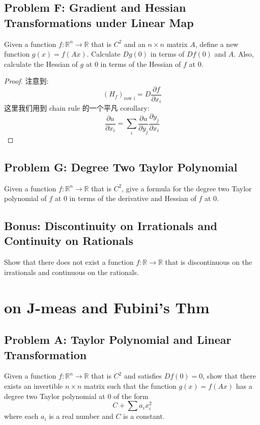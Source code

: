 \documentclass[lang=cn,11pt]{template}
\begin{document}
\section*{Problem F: Gradient and Hessian Transformations under Linear Map}
Given a function \( f : \mathbb{R}^n \rightarrow \mathbb{R} \) that is \( C^2 \) and an \( n \times n \) matrix \( A \), define a new function \( g(x) = f(Ax) \). Calculate \( Dg(0) \) in terms of \( Df(0) \) and \( A \). Also, calculate the Hessian of \( g \) at 0 in terms of the Hessian of \( f \) at 0.
\begin{proof}
    注意到:
    $$
    (H_f)_{\text{row i}} = D \frac{\partial f}{\partial x_i}
    $$
    这里我们用到 chain rule 的一个平凡 corollary:
    $$
    \frac{\partial u}{\partial x_i} = \sum_i \frac{\partial u}{\partial y_j} \frac{\partial y_j}{\partial x_i}
    $$
\end{proof}

\section*{Problem G: Degree Two Taylor Polynomial}
Given a function \( f : \mathbb{R}^n \rightarrow \mathbb{R} \) that is \( C^2 \), give a formula for the degree two Taylor polynomial of \( f \) at 0 in terms of the derivative and Hessian of \( f \) at 0.



\section*{Bonus: Discontinuity on Irrationals and Continuity on Rationals}
Show that there does not exist a function \( f : \mathbb{R} \rightarrow \mathbb{R} \) that is discontinuous on the irrationals and continuous on the rationals.






\chapter{on J-meas and Fubini's Thm}

\section*{Problem A: Taylor Polynomial and Linear Transformation}
Given a function \( f : \mathbb{R}^n \rightarrow \mathbb{R} \) that is \( C^2 \) and satisfies \( Df(0) = 0 \), show that there exists an invertible \( n \times n \) matrix such that the function \( g(x) = f(Ax) \) has a degree two Taylor polynomial at 0 of the form
\[
C + \sum a_i x_i^2
\]
where each \( a_i \) is a real number and \( C \) is a constant.
\end{document}
